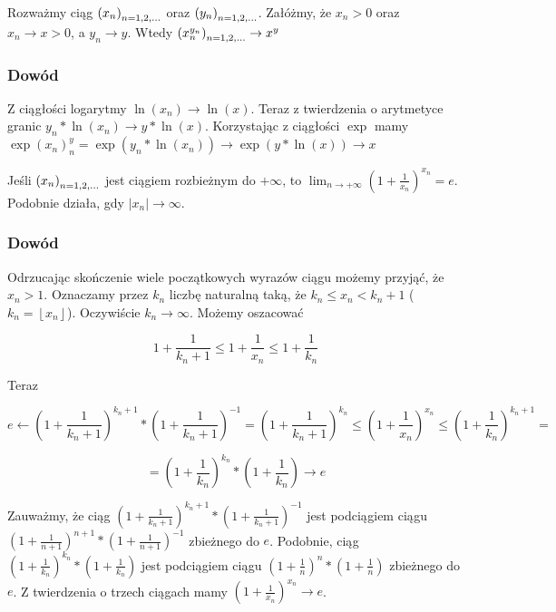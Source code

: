 \documentclass[9pt]{article}
\begin{document}
\begin{Twi} 
    Rozważmy ciąg $\left(x_n\right)_{n = 1,2,...}$ oraz $\left(y_n\right)_{n = 1,2,...}$. Załóżmy, że $x_n > 0$ oraz $x_n \to x > 0$, a $y_n
    \to y$. Wtedy $\left(x_n^{y_n}\right)_{n = 1,2,...} \to x^y$
\end{Twi}

\subsubsection*{Dowód}

Z ciągłości logarytmy $\ln(x_n) \to \ln(x)$. Teraz z twierdzenia o arytmetyce granic $y_n * \ln(x_n)
\to y * \ln(x)$. Korzystając z ciągłości $\exp$ mamy $\exp(x_n)^y_n = \exp(y_n * \ln(x_n)) \to
\exp(y * \ln(x)) \to x$

\begin{Twi}
    Jeśli $\left(x_n\right)_{n = 1,2,...}$ jest ciągiem rozbieżnym do $+\infty$, to $\lim_{n \to +\infty} \left(1 +
\frac{1}{x_n}\right)^{x_n} = e$. Podobnie działa, gdy $|x_n| \to \infty$.
\end{Twi}

\subsubsection*{Dowód}

Odrzucając skończenie wiele początkowych wyrazów ciągu możemy przyjąć, że $x_n > 1$. Oznaczamy
przez $k_n$ liczbę naturalną taką, że $k_n \le x_n < k_n + 1$ ($k_n = \left\lfloor x_n
\right\rfloor$). Oczywiście $k_n \to \infty$. Możemy oszacować

\[
    1 + \frac{1}{k_n + 1} \le 1 + \frac{1}{x_n} \le 1 + \frac{1}{k_n}
\]

Teraz

\[
    e \leftarrow \left(1 + \frac{1}{k_n + 1}\right)^{k_n+1} * \left(1 + \frac{1}{k_n + 1}\right)
    ^{-1}= \left(1 + \frac{1}{k_n + 1}\right)^{k_n} \le \left(1 + \frac{1}{x_n}\right)^{x_n}
\le \left(1 + \frac{1}{k_n}\right)^{k_n + 1} = 
\]

\[
    = \left(1 + \frac{1}{k_n}\right)^{k_n} * (1 +
    \frac{1}{k_n}) \to e
\]

Zauważmy, że ciąg $\left(1 + \frac{1}{k_n + 1}\right)^{k_n + 1} * \left(1 + \frac{1}{k_n +
1}\right)^{-1}$ jest podciągiem ciągu $\left(1 + \frac{1}{n + 1}\right)^{n + 1} * \left(1 +
\frac{1}{n + 1}\right)^{-1}$ zbieżnego do $e$. Podobnie, ciąg $\left(1+\frac{1}{k_n}\right)^{k_n} *
\left(1 + \frac{1}{k_n}\right)$ jest podciągiem ciągu $\left(1+\frac{1}{n}\right)^{n} * \left(1 +
\frac{1}{n}\right)$ zbieżnego do $e$. Z twierdzenia o trzech ciągach mamy $\left(1 +
\frac{1}{x_n}\right)^{x_n} \to e$.
\end{document}
